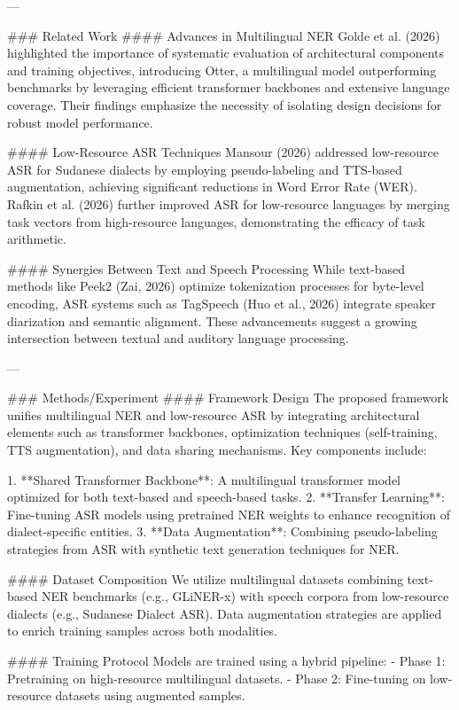 ---

### Related Work  
#### Advances in Multilingual NER  
Golde et al. (2026) highlighted the importance of systematic evaluation of architectural components and training objectives, introducing Otter, a multilingual model outperforming benchmarks by leveraging efficient transformer backbones and extensive language coverage. Their findings emphasize the necessity of isolating design decisions for robust model performance.

#### Low-Resource ASR Techniques  
Mansour (2026) addressed low-resource ASR for Sudanese dialects by employing pseudo-labeling and TTS-based augmentation, achieving significant reductions in Word Error Rate (WER). Rafkin et al. (2026) further improved ASR for low-resource languages by merging task vectors from high-resource languages, demonstrating the efficacy of task arithmetic.

#### Synergies Between Text and Speech Processing  
While text-based methods like Peek2 (Zai, 2026) optimize tokenization processes for byte-level encoding, ASR systems such as TagSpeech (Huo et al., 2026) integrate speaker diarization and semantic alignment. These advancements suggest a growing intersection between textual and auditory language processing.

---

### Methods/Experiment  
#### Framework Design  
The proposed framework unifies multilingual NER and low-resource ASR by integrating architectural elements such as transformer backbones, optimization techniques (self-training, TTS augmentation), and data sharing mechanisms. Key components include:

1. **Shared Transformer Backbone**: A multilingual transformer model optimized for both text-based and speech-based tasks.
2. **Transfer Learning**: Fine-tuning ASR models using pretrained NER weights to enhance recognition of dialect-specific entities.
3. **Data Augmentation**: Combining pseudo-labeling strategies from ASR with synthetic text generation techniques for NER.

#### Dataset Composition  
We utilize multilingual datasets combining text-based NER benchmarks (e.g., GLiNER-x) with speech corpora from low-resource dialects (e.g., Sudanese Dialect ASR). Data augmentation strategies are applied to enrich training samples across both modalities.

#### Training Protocol  
Models are trained using a hybrid pipeline:
- Phase 1: Pretraining on high-resource multilingual datasets.
- Phase 2: Fine-tuning on low-resource datasets using augmented samples.

